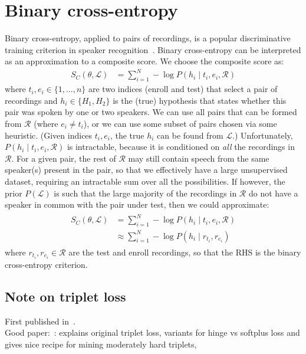 \documentclass[a4paper,oneside,12pt,english]{report}
\def\Lset{\mathcal{L}}
\def\Rset{\mathcal{R}}
\begin{document}
\section{Binary cross-entropy}
Binary cross-entropy, applied to pairs of recordings, is a popular discriminative training criterion in speaker recognition~\cite{STBUFusion,Sandro_pairs,calibration_Odyssey14,end2end_google,end2end}. Binary cross-entropy can be interpreted as an approximation to a composite score. We choose the composite score as:
\begin{align}
S_C(\theta,\Lset) &= \sum_{i=1}^N -\log P(h_i \mid t_i, e_i, \Rset)
\end{align} 
where $t_i,e_i\in\{1,\ldots,n\}$ are two indices (enroll and test) that select a pair of recordings and $h_i\in\{H_1,H_2\}$ is the (true) hypothesis that states whether this pair was spoken by one or two speakers. We can use all pairs that can be formed from $\Rset$ (where $e_i\ne t_i$), or we can use some subset of pairs chosen via some heuristic. (Given indices $t_i,e_i$, the true $h_i$ can be found from $\Lset$.) Unfortunately, $P(h_i \mid t_i, e_i, \Rset)$ is intractable, because it is conditioned on \emph{all} the recordings in $\Rset$. For a given pair, the rest of $\Rset$ may still contain speech from the same speaker(s) present in the pair, so that we effectively have a large unsupervised dataset, requiring an intractable sum over all the possibilities. If however, the prior $P(\Lset)$ is such that the large majority of the recordings in $\Rset$ do not have a speaker in common with the pair under test, then we could approximate:
\begin{align}
\begin{split}
S_C(\theta,\Lset) &= \sum_{i=1}^N -\log P(h_i \mid t_i, e_i, \Rset) \\
&\approx \sum_{i=1}^N -\log P(h_i \mid r_{t_i}, r_{e_i})
\end{split}
\end{align} 
where $r_{t_i}, r_{e_i}\in\Rset$ are the test and enroll recordings, so that the RHS is the binary cross-entropy criterion.


\subsection{Note on triplet loss}
First published in~\cite{Facenet}.\\

\noindent Good paper:~\cite{Defense_Triplet}: explains original triplet loss, variants for hinge vs softplus loss and gives nice recipe for mining moderately hard triplets,
\end{document}
